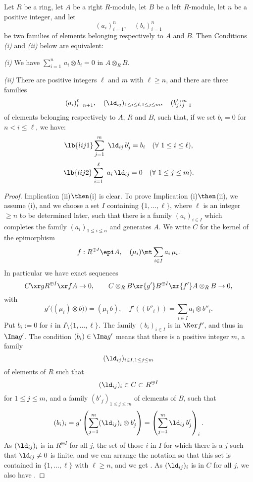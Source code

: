 \documentclass[12pt]{article}
\theoremstyle{remark}
\theoremstyle{definition}
\begin{document}
\begin{lem}
Let $R$ be a ring, let $A$ be a right $R$-module, let $B$ be a left $R$-module, let $n$ be a positive integer, and let 
$$
(a_i)_{i=1}^n,\quad(b_i)_{i=1}^n
$$
be two families of elements belonging respectively to $A$ and $B$. Then Conditions \emph{(i)} and \emph{(ii)} below are equivalent:

\nn\emph{(i)} We have $\sum_{i=1}^n\,a_i\otimes b_i=0$ in $A\otimes_RB$. 

\nn\emph{(ii)} There are positive integers $\ell$ and $m$ with $\ell\ge n$, and there are three families 
$$
(a_i)_{i=n+1}^\ell,\quad(\ld_{ij})_{1\le i\le\ell,1\le j\le m},\quad(b'_j)_{j=1}^m
$$ 
of elements belonging respectively to $A$, $R$ and $B$, such that, if we set $b_i=0$ for $n<i\le\ell$, we have:
%
\begin{equation}\lb{lij1}
\sum_{j=1}^m\ \ld_{ij}\,b'_j=b_i\quad(\forall\ 1\le i\le\ell),
\end{equation}
%
\begin{equation}\lb{lij2}
\sum_{i=1}^\ell\ a_i\,\ld_{ij}=0\quad(\forall\ 1\le j\le m).
\end{equation}
\end{lem} 

\begin{proof} 
Implication (ii)$\then$(i) is clear. To prove Implication (i)$\then$(ii), we assume (i), and we choose a set $I$ containing $\{1,\dots,\ell\}$, where $\ell$ is an integer $\ge n$ to be determined later, such that there is a family $(a_i)_{i\in I}$ which completes the family $(a_i)_{1\le i\le n}$ and generates $A$. We write $C$ for the kernel of the epimorphism 
$$
f:R^{\oplus I}\epi A,\quad(\mu_i)\mt\sum_{i\in I}a_i\,\mu_i.
$$ 
In particular we have exact sequences 
$$
C\xr gR^{\oplus I}\xr fA\to0,\qquad C\otimes_RB\xr{g'}B^{\oplus I}\xr{f'}A\otimes_RB\to0,
$$ 
with 
$$
g'\big((\mu_i)\otimes b)\big)=(\mu_i\,b),\quad f'((b''_i))=\sum_{i\in I}a_i\otimes b''_i.
$$
Put $b_i:=0$ for $i$ in $I\setminus\{1,\dots,\ell\}$. The family $(b_i)_{i\in I}$ is in $\Ker f'$, and thus in $\Ima g'$. The condition $(b_i)\in\Ima g'$ means that there is a positive integer $m$, a family 
$$
(\ld_{ij})_{i\in I,1\le j\le m}
$$ 
of elements of $R$ such that 
$$
(\ld_{ij})_i\in C\subset R^{\oplus I}
$$ 
for $1\le j\le m$, and a family $(b'_j)_{1\le j\le m}$ of elements of $B$, such that 
$$
(b_i)_i=g'
\left(\sum_{j=1}^m(\ld_{ij})_i\otimes b'_j\right)=
\left(\sum_{j=1}^m\ld_{ij}\,b'_j\right)_i.
$$ 
As $(\ld_{ij})_i$ is in $R^{\oplus I}$ for all $j$, the set of those $i$ in $I$ for which there is a $j$ such that $\ld_{ij}\neq0$ is finite, and we can arrange the notation so that this set is contained in $\{1,\dots,\ell\}$ with $\ell\ge n$, and we get . As $(\ld_{ij})_i$ is in $C$ for all $j$, we also have . 
\end{proof} 
\end{document}
